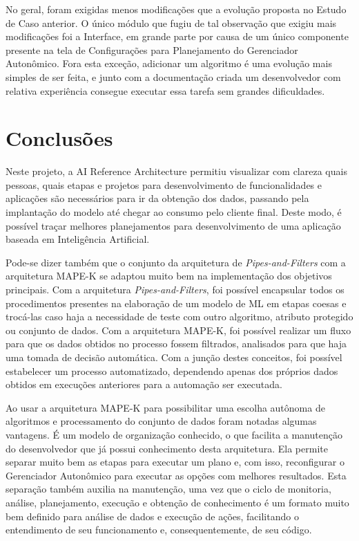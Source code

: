 \documentclass[Portugues,Final]{ic-tese-v3}
\begin{document}
No geral, foram exigidas menos modificações que a evolução proposta no Estudo de Caso anterior. O único módulo que fugiu de tal observação que exigiu mais modificações foi a Interface, em grande parte por causa de um único componente presente na tela de Configurações para Planejamento do Gerenciador Autonômico. Fora esta exceção, adicionar um algoritmo é uma evolução mais simples de ser feita, e junto com a documentação criada um desenvolvedor com relativa experiência consegue executar essa tarefa sem grandes dificuldades.

\chapter{Conclusões}

Neste projeto, a AI Reference Architecture permitiu visualizar com clareza quais pessoas, quais etapas e projetos para desenvolvimento de funcionalidades e aplicações são necessários para ir da obtenção dos dados, passando pela implantação do modelo até chegar ao consumo pelo cliente final. Deste modo, é possível traçar melhores planejamentos para desenvolvimento de uma aplicação baseada em Inteligência Artificial. 

Pode-se dizer também que o conjunto da arquitetura de \textit{Pipes-and-Filters} com a arquitetura MAPE-K se adaptou muito bem na implementação dos objetivos principais. Com a arquitetura \textit{Pipes-and-Filters}, foi possível encapsular todos os procedimentos presentes na elaboração de um modelo de ML em etapas coesas e trocá-las caso haja a necessidade de teste com outro algoritmo, atributo protegido ou conjunto de dados. Com a arquitetura MAPE-K, foi possível realizar um fluxo para que os dados obtidos no processo fossem filtrados, analisados para que haja uma tomada de decisão automática. Com a junção destes conceitos, foi possível estabelecer um processo automatizado, dependendo apenas dos próprios dados obtidos em execuções anteriores para a automação ser executada.

Ao usar a arquitetura MAPE-K para possibilitar uma escolha autônoma de algoritmos e processamento do conjunto de dados foram notadas algumas vantagens. É um modelo de organização conhecido, o que facilita a manutenção do desenvolvedor que já possui conhecimento desta arquitetura. Ela permite separar muito bem as etapas para executar um plano e, com isso, reconfigurar o Gerenciador Autonômico para executar as opções com melhores resultados. Esta separação também auxilia na manutenção, uma vez que o ciclo de monitoria, análise, planejamento, execução e obtenção de conhecimento é um formato muito bem definido para análise de dados e execução de ações, facilitando o entendimento de seu funcionamento e, consequentemente, de seu código.
\end{document}
